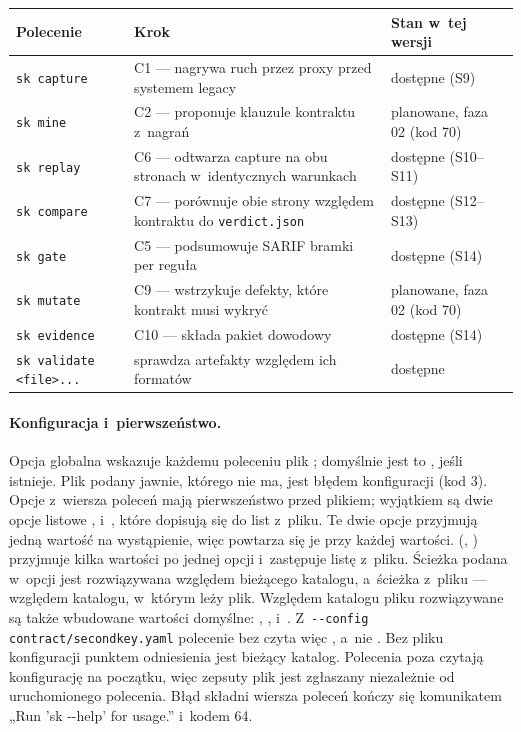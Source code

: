 {\small
\begin{tabularx}{\linewidth}{@{}>{\raggedright\arraybackslash}p{3.4cm} >{\raggedright\arraybackslash}X >{\raggedright\arraybackslash}p{4cm}@{}}
\toprule
Polecenie & Krok & Stan w~tej wersji \\
\midrule
\texttt{sk capture} & C1 --- nagrywa ruch przez proxy przed systemem legacy & dostępne (S9) \\
\texttt{sk mine} & C2 --- proponuje klauzule kontraktu z~nagrań & planowane, faza 02
(kod 70) \\
\texttt{sk replay} & C6 --- odtwarza capture na obu stronach w~identycznych warunkach &
dostępne (S10–S11) \\
\texttt{sk compare} & C7 --- porównuje obie strony względem kontraktu do
\texttt{verdict.json} & dostępne (S12–S13) \\
\texttt{sk gate} & C5 --- podsumowuje SARIF bramki per reguła & dostępne (S14) \\
\texttt{sk mutate} & C9 --- wstrzykuje defekty, które kontrakt musi wykryć & planowane,
faza 02 (kod 70) \\
\texttt{sk evidence} & C10 --- składa pakiet dowodowy & dostępne (S14) \\
\texttt{sk validate <file>...} & sprawdza artefakty względem ich formatów & dostępne \\
\bottomrule
\end{tabularx}
}

\paragraph{Konfiguracja i~pierwszeństwo.} Opcja globalna  wskazuje
każdemu poleceniu plik ; domyślnie jest to ,
jeśli istnieje. Plik podany jawnie, którego nie ma, jest błędem konfiguracji (kod 3). Opcje z~wiersza poleceń mają pierwszeństwo przed plikiem; wyjątkiem są dwie opcje listowe
,  i~, które
dopisują się do list z~pliku. Te dwie opcje przyjmują jedną wartość na wystąpienie, więc
powtarza się je przy każdej wartości.  (,
) przyjmuje kilka wartości po jednej opcji i~zastępuje listę z~pliku.
Ścieżka podana w~opcji jest rozwiązywana względem bieżącego katalogu, a~ścieżka z~pliku ---
względem katalogu, w~którym leży plik. Względem katalogu pliku rozwiązywane są także
wbudowane wartości domyślne: , ,
 i~. Z~\texttt{-{}-config
contract/secondkey.yaml} polecenie  bez  czyta więc
, a~nie . Bez pliku
konfiguracji punktem odniesienia jest bieżący katalog. Polecenia poza
 czytają konfigurację na początku, więc zepsuty plik jest zgłaszany
niezależnie od uruchomionego polecenia. Błąd składni wiersza poleceń kończy się komunikatem
„Run 'sk -{}-help' for usage.” i~kodem 64.

